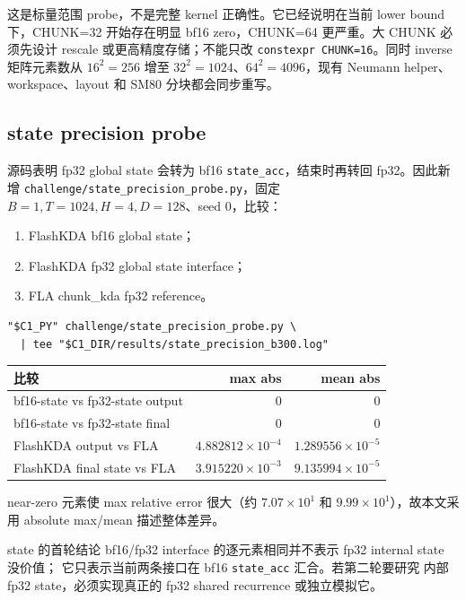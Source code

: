 \documentclass[11pt,a4paper,fontset=none]{ctexart}
\newcommand{\code}[1]{\texttt{#1}}
\begin{document}
这是标量范围 probe，不是完整 kernel 正确性。它已经说明在当前 lower bound
下，CHUNK=32 开始存在明显 bf16 zero，CHUNK=64 更严重。大 CHUNK 必须先设计
rescale 或更高精度存储；不能只改 \code{constexpr CHUNK=16}。同时 inverse
矩阵元素数从 \(16^2=256\) 增至 \(32^2=1024\)、\(64^2=4096\)，现有
Neumann helper、workspace、layout 和 SM80 分块都会同步重写。

\subsection{state precision probe}

源码表明 fp32 global state 会转为 bf16 \code{state\_acc}，结束时再转回
fp32。因此新增 \code{challenge/state\_precision\_probe.py}，固定
\(B=1,T=1024,H=4,D=128\)、seed 0，比较：

\begin{enumerate}
  \item FlashKDA bf16 global state；
  \item FlashKDA fp32 global state interface；
  \item FLA chunk\_kda fp32 reference。
\end{enumerate}

\begin{lstlisting}
"$C1_PY" challenge/state_precision_probe.py \
  | tee "$C1_DIR/results/state_precision_b300.log"
\end{lstlisting}

\begin{center}\small
\begin{tabular}{@{}lrr@{}}
\toprule
比较 & max abs & mean abs \\
\midrule
bf16-state vs fp32-state output & 0 & 0 \\
bf16-state vs fp32-state final & 0 & 0 \\
FlashKDA output vs FLA & \(4.882812\times10^{-4}\) & \(1.289556\times10^{-5}\) \\
FlashKDA final state vs FLA & \(3.915220\times10^{-3}\) & \(9.135994\times10^{-5}\) \\
\bottomrule
\end{tabular}
\end{center}

near-zero 元素使 max relative error 很大（约 \(7.07\times10^1\) 和
\(9.99\times10^1\)），故本文采用 absolute max/mean 描述整体差异。

\begin{decision}{state 的首轮结论}
bf16/fp32 interface 的逐元素相同并不表示 fp32 internal state 没价值；
它只表示当前两条接口在 bf16 \code{state\_acc} 汇合。若第二轮要研究
内部 fp32 state，必须实现真正的 fp32 shared recurrence 或独立模拟它。
\end{decision}
\end{document}
